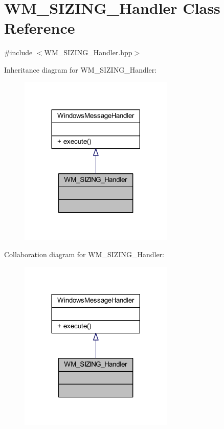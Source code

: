\hypertarget{class_w_m___s_i_z_i_n_g___handler}{}\section{W\+M\+\_\+\+S\+I\+Z\+I\+N\+G\+\_\+\+Handler Class Reference}
\label{class_w_m___s_i_z_i_n_g___handler}


{\ttfamily \#include $<$W\+M\+\_\+\+S\+I\+Z\+I\+N\+G\+\_\+\+Handler.\+hpp$>$}



Inheritance diagram for W\+M\+\_\+\+S\+I\+Z\+I\+N\+G\+\_\+\+Handler\+:\nopagebreak
\begin{figure}[H]
\begin{center}
\leavevmode
\includegraphics[width=209pt]{class_w_m___s_i_z_i_n_g___handler__inherit__graph}
\end{center}
\end{figure}


Collaboration diagram for W\+M\+\_\+\+S\+I\+Z\+I\+N\+G\+\_\+\+Handler\+:\nopagebreak
\begin{figure}[H]
\begin{center}
\leavevmode
\includegraphics[width=209pt]{class_w_m___s_i_z_i_n_g___handler__coll__graph}
\end{center}
\end{figure}
